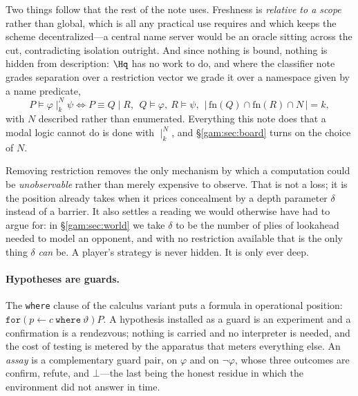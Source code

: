Two things follow that the rest of the note uses. Freshness is
\emph{relative to a scope} rather than global, which is all any practical use
requires and which keeps the scheme decentralized---a central name server would
be an oracle sitting across the cut, contradicting isolation outright. And since
nothing is bound, nothing is hidden from description: $\Hq$ has no work to do,
and where the classifier note grades separation over a restriction vector we
grade it over a namespace given by a name predicate,
\[
P \models \varphi \mid_k^{N} \psi \iff P \equiv Q\mid R,\ \ Q \models \varphi,\
R \models \psi,\ \ |\,\mathrm{fn}(Q)\cap \mathrm{fn}(R) \cap N\,| = k ,
\]
with $N$ described rather than enumerated. Everything this note does that a
modal logic cannot do is done with $\mid_k^N$, and \S\ref{gam:sec:board} turns on
the choice of $N$.

\begin{remark}\label{gam:concealment-price-wall}
Removing restriction removes the only mechanism by which a computation could be
\emph{unobservable} rather than merely expensive to observe. That is not a loss;
it is the position \chSci already takes when it prices concealment by
a depth parameter $\delta$ instead of a barrier. It also settles a reading we
would otherwise have had to argue for: in \S\ref{gam:sec:world} we take $\delta$ to
be the number of plies of lookahead needed to model an opponent, and with no
restriction available that is the only thing $\delta$ \emph{can} be. A player's
strategy is never hidden. It is only ever deep.
\end{remark}

\paragraph{Hypotheses are guards.} The \texttt{where} clause of the \rh{}
calculus variant \cite{Omnibus} puts a formula in operational position:
$\texttt{for}(p \leftarrow c \ \texttt{where}\ \vartheta)P$. A hypothesis
installed as a guard is an experiment and a confirmation is a rendezvous;
nothing is carried and no interpreter is needed, and the cost of testing is
metered by the apparatus that meters everything else. An \emph{assay} is a
complementary guard pair, on $\varphi$ and on $\neg\varphi$, whose three
outcomes are \textsf{confirm}, \textsf{refute}, and $\bot$---the last being the
honest residue in which the environment did not answer in time.

